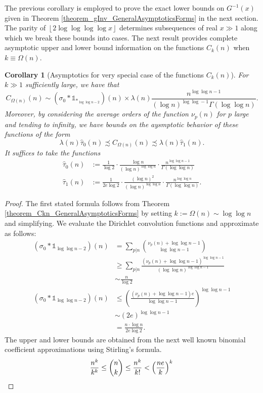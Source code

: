 \documentclass[11pt,reqno,a4letter]{article}
\numberwithin{figure}{section}
\numberwithin{table}{section}
\newcommand{\floor}[1]{\left\lfloor #1 \right\rfloor}
\theoremstyle{plain}
\newtheorem{cor}[theorem]{Corollary}
\numberwithin{theorem}{section}
\theoremstyle{definition}
\begin{document}
The previous corollary is employed to prove the exact lower bounds on 
$G^{-1}(x)$ given in Theorem \ref{theorem_gInv_GeneralAsymptoticsForms} in the next section. 
The parity of $\floor{2\log\log\log\log x}$ determines subsequences of real $x \gg 1$ 
along which we break these bounds into cases. 
The next result provides complete asymptotic upper and lower bound 
information on the functions $C_k(n)$ when $k \equiv \Omega(n)$. 

\begin{cor}[Asymptotics for very special case of the functions $C_k(n)$] 
\label{cor_Asymptotics_KeyCases_Of_Ckn_v1} 
For $k \gg 1$ sufficiently large, we have that 
\[
C_{\Omega(n)}(n) \sim (\sigma_0 \ast \mathds{1}_{\ast_{\log\log n-2}})(n) \times \lambda(n) 
     \frac{n^{\log\log n -1}}{(\log n)^{\log\log -1} \Gamma(\log\log n)}. 
\]
Moreover, by considering the average orders of the function $\nu_p(n)$ for $p$ large and 
tending to infinity, we have bounds on the aysmptotic behavior of these functions 
of the form 
\[
\lambda(n)\widehat{\tau}_0(n) \precsim C_{\Omega(n)}(n) \precsim \lambda(n)\widehat{\tau}_1(n). 
\]
It suffices to take the functions 
\begin{align*} 
\widehat{\tau}_0(n) & := \frac{1}{\log 2} \cdot \frac{\log n}{(\log n)^{\log\log n}} \cdot 
     \frac{n^{\log\log n-1}}{\Gamma(\log\log n)} \\ 
\widehat{\tau}_1(n) & := \frac{1}{2e \log 2} \cdot \frac{(\log n)^2}{(\log n)^{\log\log n}} \cdot 
     \frac{n^{\log\log n}}{\Gamma(\log\log n)}. 
\end{align*} 
\end{cor} 
\begin{proof} 
The first stated formula follows from 
Theorem \ref{theorem_Ckn_GeneralAsymptoticsForms} by setting 
$k := \Omega(n) \sim \log\log n$ and simplifying. We evaluate the Dirichlet convolution 
functions and approximate as follows: 
\begin{align*} 
(\sigma_0 \ast \mathds{1}_{\log\log n-2})(n) & = \sum_{p|n} \binom{\nu_p(n) + \log\log n-1}{\log\log n-1} \\ 
     & \geq \sum_{p|n} \frac{(\nu_p(n) + \log\log n-1)^{\log\log n-1}}{(\log\log n)^{\log\log n-1}} \\ 
     & \sim \frac{n}{\log 2} \\ 
(\sigma_0 \ast \mathds{1}_{\log\log n-2})(n) & \leq \left(
     \frac{(\nu_p(n) + \log\log n-1)e}{\log\log n-1} 
     \right)^{\log\log n -1} \\ 
     & \sim (2e)^{\log\log n-1} \\ 
     & = \frac{n \cdot \log n}{2e \log 2}.    
\end{align*} 
The upper and lower bounds are obtained from the next well known binomial coefficient approximations 
using Stirling's formula. 
\[
\frac{n^k}{k^k} \leq \binom{n}{k} \leq \frac{n^k}{k!} < \left(\frac{ne}{k}\right)^k 
     \qedhere 
\]
\end{proof} 
\end{document}
